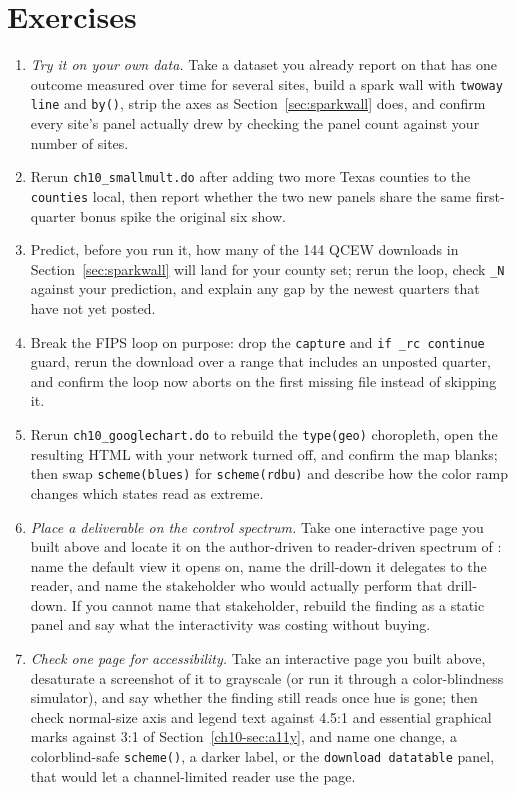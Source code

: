 \documentclass[
    a4paper,
    fontsize=10pt,
    twoside=true,
    numbers=noenddot,
]{kaobook}
\begin{document}
\section*{Exercises}
\begin{enumerate}
\item \emph{Try it on your own data.} Take a dataset you already report on that has one outcome measured over time for several sites, build a spark wall with \texttt{twoway line} and \texttt{by()}, strip the axes as Section~\ref{sec:sparkwall} does, and confirm every site's panel actually drew by checking the panel count against your number of sites.
\item Rerun \texttt{ch10\_smallmult.do} after adding two more Texas counties to the \texttt{counties} local, then report whether the two new panels share the same first-quarter bonus spike the original six show.
\item Predict, before you run it, how many of the 144 QCEW downloads in Section~\ref{sec:sparkwall} will land for your county set; rerun the loop, check \texttt{\_N} against your prediction, and explain any gap by the newest quarters that have not yet posted.
\item Break the FIPS loop on purpose: drop the \texttt{capture} and \texttt{if \_rc continue} guard, rerun the download over a range that includes an unposted quarter, and confirm the loop now aborts on the first missing file instead of skipping it.
\item Rerun \texttt{ch10\_googlechart.do} to rebuild the \texttt{type(geo)} choropleth, open the resulting HTML with your network turned off, and confirm the map blanks; then swap \texttt{scheme(blues)} for \texttt{scheme(rdbu)} and describe how the color ramp changes which states read as extreme.
\item \emph{Place a deliverable on the control spectrum.} Take one interactive page you built above and locate it on the author-driven to reader-driven spectrum of \textcite{segel2010narrative}: name the default view it opens on, name the drill-down it delegates to the reader, and name the stakeholder who would actually perform that drill-down. If you cannot name that stakeholder, rebuild the finding as a static panel and say what the interactivity was costing without buying.
\item \emph{Check one page for accessibility.} Take an interactive page you built above, desaturate a screenshot of it to grayscale (or run it through a color-blindness simulator), and say whether the finding still reads once hue is gone; then check normal-size axis and legend text against 4.5:1 and essential graphical marks against 3:1 of Section~\ref{ch10-sec:a11y}, and name one change, a colorblind-safe \texttt{scheme()}, a darker label, or the \texttt{download datatable} panel, that would let a channel-limited reader use the page.

\end{enumerate}
\end{document}
